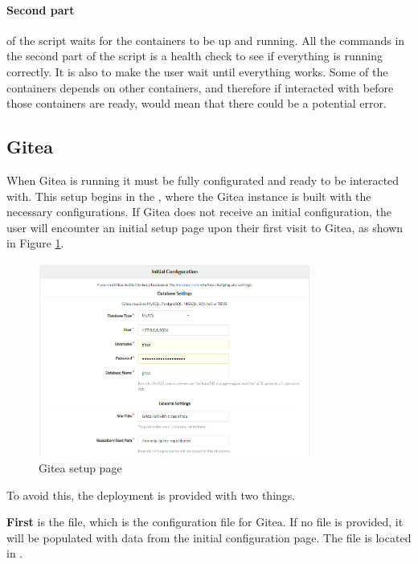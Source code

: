 \paragraph{Second part} of the script waits for the containers to be up and running.
All the commands in the second part of the script is a health check to see if everything is running correctly.
It is also to make the user wait until everything works. Some of the containers depends on other containers, and 
therefore if interacted with before those containers are ready, would mean that there could be a potential error.


\subsection{Gitea}
\label{sec:pipeline-local-gitea}

When Gitea is running it must be fully configurated and ready to be interacted with.
This setup begins in the , 
where the Gitea instance is built with the necessary configurations. If Gitea does not receive an initial configuration, 
the user will encounter an initial setup page upon their first visit to Gitea, as shown in Figure \ref{fig:gitea-setup}.
\begin{figure}[h]
    \centering
    \includegraphics[width=0.8\textwidth]{images/initial_conf.png}
    \caption{Gitea setup page}
    \label{fig:gitea-setup}
\end{figure}
To avoid this, the deployment is provided with two things.

\textbf{First} is the  file, which is the configuration file for Gitea. If no  file is provided, 
it will be populated with data from the initial configuration page. The  file is located in .

